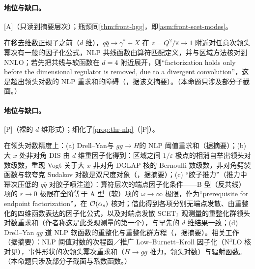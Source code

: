 \paragraph{地位与缺口。}[A]（只读到摘要层次）；瓶颈同\cref{thm:front-hgg}，即\cref{asm:front-scet-modes}。

\begin{proposition}\label{prop:front-nlp-threshold}
在移去维数正规子之前（$d$ 维），$q\bar q\to\gamma^*+X$ 在 $z=Q^2/\hat s\to1$ 附近对任意次领头幂次有一般的因子化公式，NLP 共线函数由算符匹配定义，并与区域方法核对到 NNLO；若先把共线与软函数在 $d=4$ 附近展开，则“factorization holds only before the dimensional regulator is removed, due to a divergent convolution”，这是超出领头对数的 NLP 重求和的障碍（\cite{Beneke:2019oqx}，据该文摘要）。（本命题只涉及部分子截面。）
\end{proposition}

\paragraph{地位与缺口。}[P]（裸的 $d$ 维形式）；细化了\cref{prop:thr-nlp}（[P]）。

\begin{proposition}\label{prop:front-nlp-ll}
在领头对数精度上：(a) Drell--Yan\cite{Beneke:2018gvs}与 $gg\to H$\cite{Beneke:2019mua}的 NLP 阈值重求和（据摘要）；(b) 大 $x$ 处非对角 DIS 由 $d$ 维重因子化得到：区域之间 $1/\varepsilon$ 极点的相消自举出领头对数级数，重现 Vogt 关于大 $x$ 非对角 DGLAP 核的 Bernoulli 数级数，非对角劈裂函数与软夸克 Sudakov 对数是双尺度对象（\cite{Beneke:2020ibj}，据摘要）；(c) “胶子推力”（推力中幂次压低的 $q\bar q$ 对胶子喷注道）：算符层次的端点因子化条件——B 型（反共线）项的 $r\to0$ 极限在全阶等于 A 型（软）项的 $\omega\to\infty$ 极限，作为“prerequisite for endpoint factorization”，在 $\mathcal{O}\!\left(\alpha_s\right)$ 核对；借此得到各项分别无端点发散、由重整化的四维函数表达的因子化公式，以及对端点发散 SCET$_{\rm I}$ 观测量的重整化群领头对数重求和（作者称这是此类观测量的第一个），与早先的 $d$ 维结果一致\cite[第~1--2、4~节]{Beneke:2022obx}；(d) Drell--Yan $qg$ 道 NLP 软函数的重整化与重整化群方程（\cite{Beneke:2025ufd}，据摘要）。相关工作（据摘要）：NLP 阈值对数的次程函／推广 Low--Burnett--Kroll 因子化\cite{Bonocore:2015esa,Bonocore:2016awd}（N$^3$LO 核对见\cite{Bahjat-Abbas:2018hpv}），事件形状的次领头幂次重求和（$H\to gg$ 推力，领头对数\cite{Moult:2018jjd}）与辐射函数\cite{Moult:2019mog}。（本命题只涉及部分子截面与系数函数。）
\end{proposition}

